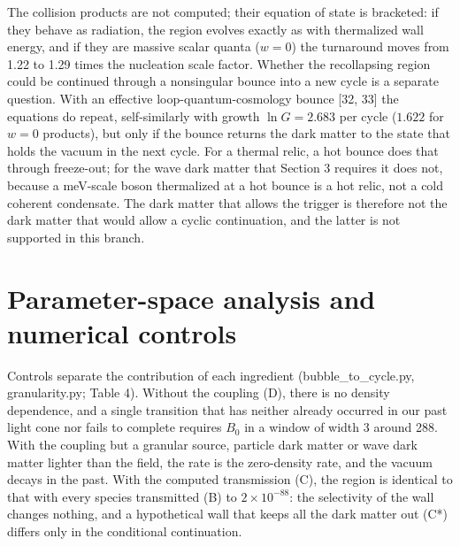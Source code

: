 \documentclass[preprint,12pt]{elsarticle}
\begin{document}
The collision products are not computed; their equation of state is bracketed: if they behave as radiation, the region evolves exactly as with thermalized wall energy, and if they are massive scalar quanta ($w=0$) the turnaround moves from 1.22 to 1.29 times the nucleation scale factor. Whether the recollapsing region could be continued through a nonsingular bounce into a new cycle is a separate question. With an effective loop-quantum-cosmology bounce [32, 33] the equations do repeat, self-similarly with growth $\ln G=2.683$ per cycle ($1.622$ for $w=0$ products), but only if the bounce returns the dark matter to the state that holds the vacuum in the next cycle. For a thermal relic, a hot bounce does that through freeze-out; for the wave dark matter that Section 3 requires it does not, because a meV-scale boson thermalized at a hot bounce is a hot relic, not a cold coherent condensate. The dark matter that allows the trigger is therefore not the dark matter that would allow a cyclic continuation, and the latter is not supported in this branch.

\section{Parameter-space analysis and numerical controls}
Controls separate the contribution of each ingredient (bubble\_to\_cycle.py, granularity.py; Table 4). Without the coupling (D), there is no density dependence, and a single transition that has neither already occurred in our past light cone nor fails to complete requires $B_0$ in a window of width 3 around 288. With the coupling but a granular source, particle dark matter or wave dark matter lighter than the field, the rate is the zero-density rate, and the vacuum decays in the past. With the computed transmission (C), the region is identical to that with every species transmitted (B) to $2\times10^{-88}$: the selectivity of the wall changes nothing, and a hypothetical wall that keeps all the dark matter out (C*) differs only in the conditional continuation.
\end{document}
